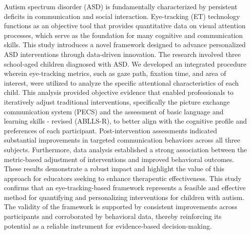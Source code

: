 Autism spectrum disorder (ASD) is fundamentally characterized by persistent deficits in communication and social interaction. Eye-tracking (ET) technology functions as an objective tool that provides quantitative data on visual attention processes, which serve as the foundation for many cognitive and communication skills. This study introduces a novel framework designed to advance personalized ASD interventions through data-driven innovation. The research involved three school-aged children diagnosed with ASD. We developed an integrated procedure wherein eye-tracking metrics, such as gaze path, fixation time, and area of interest, were utilized to analyze the specific attentional characteristics of each child. This analysis provided objective evidence that enabled professionals to iteratively adjust traditional interventions, specifically the picture exchange communication system (PECS) and the assessment of basic language and learning skills - revised (ABLLS-R), to better align with the cognitive profile and preferences of each participant. Post-intervention assessments indicated substantial improvements in targeted communication behaviors across all three subjects. Furthermore, data analysis established a strong association between the metric-based adjustment of interventions and improved behavioral outcomes. These results demonstrate a robust impact and highlight the value of this approach for educators seeking to enhance therapeutic effectiveness. This study confirms that an eye-tracking-based framework represents a feasible and effective method for quantifying and personalizing interventions for children with autism. The validity of the framework is supported by consistent improvements across participants and corroborated by behavioral data, thereby reinforcing its potential as a reliable instrument for evidence-based decision-making.
